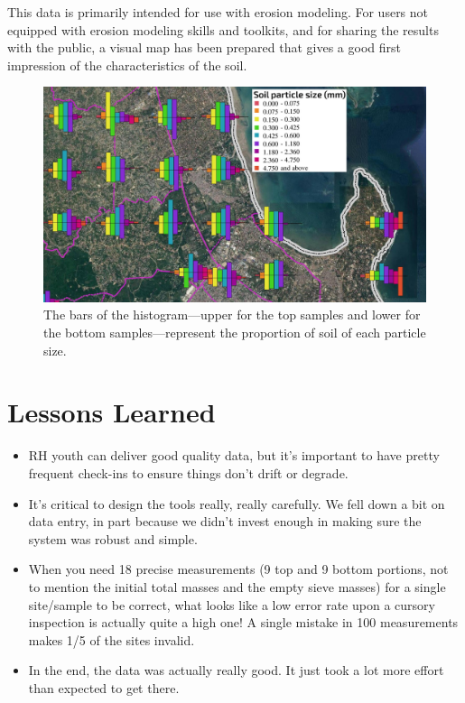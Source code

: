 \documentclass[a4paper,12pt]{article}
\begin{document}
This data is primarily intended for use with erosion modeling. For users not equipped with erosion modeling skills and toolkits, and for sharing the results with the public, a visual map has been prepared that gives a good first impression of the characteristics of the soil.


\begin{figure}[h]
  \caption{The bars of the histogram---upper for the top samples and lower for the bottom samples---represent the proportion of soil of each particle size.}
  \centering
  \includegraphics[width=1.1\textwidth]{soil_map_detail_peninsula_with_legend}
\end{figure}



\section{Lessons Learned}
\label{lessonslearned}

\hypertarget{lessonslearned}{}

\begin{itemize}
  \item RH youth can deliver good quality data, but it's important to have pretty frequent check-ins to ensure things don't drift or degrade.
  \item It's critical to design the tools really, really carefully. We fell down a bit on data entry, in part because we didn't invest enough in making sure the system was robust and simple.
  \item When you need 18 precise measurements (9 top and 9 bottom portions, not to mention the initial total masses and the empty sieve masses) for a single site/sample to be correct, what looks like a low error rate upon a cursory inspection is actually quite a high one! A single mistake in 100 measurements makes 1/5 of the sites invalid.
  \item In the end, the data was actually really good. It just took a lot more effort than expected to get there.
\end{itemize}
\end{document}
